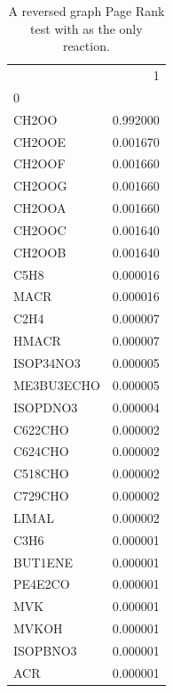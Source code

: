 \begin{table}[H]
    \begin{tabular}{lr}
    \toprule
    {} &         1 \\
    0          &           \\
    \midrule
    CH2OO      &  0.992000 \\
    CH2OOE     &  0.001670 \\
    CH2OOF     &  0.001660 \\
    CH2OOG     &  0.001660 \\
    CH2OOA     &  0.001660 \\
    CH2OOC     &  0.001640 \\
    CH2OOB     &  0.001640 \\
    C5H8       &  0.000016 \\
    MACR       &  0.000016 \\
    C2H4       &  0.000007 \\
    HMACR      &  0.000007 \\
    ISOP34NO3  &  0.000005 \\
    ME3BU3ECHO &  0.000005 \\
    ISOPDNO3   &  0.000004 \\
    C622CHO    &  0.000002 \\
    C624CHO    &  0.000002 \\
    C518CHO    &  0.000002 \\
    C729CHO    &  0.000002 \\
    LIMAL      &  0.000002 \\
    C3H6       &  0.000001 \\
    BUT1ENE    &  0.000001 \\
    PE4E2CO    &  0.000001 \\
    MVK        &  0.000001 \\
    MVKOH      &  0.000001 \\
    ISOPBNO3   &  0.000001 \\
    ACR        &  0.000001 \\
    \bottomrule
    \end{tabular}
\label{tab:ch2ooe}
\caption{A reversed graph Page Rank test with  as the only reaction.}
\end{table} 

